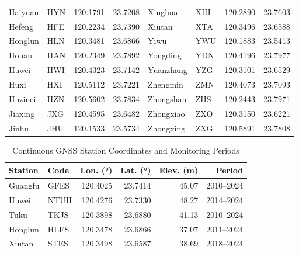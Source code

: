 \begin{table}[htbp]
\begin{tabular}{llcc|llcc}
		Haiyuan & HYN & 120.1791 & 23.7208 & Xinghua & XIH & 120.2890 & 23.7603 \\
		Hefeng & HFE & 120.2234 & 23.7390 & Xiutan & XTA & 120.3496 & 23.6588 \\
		Honglun & HLN & 120.3481 & 23.6866 & Yiwu & YWU & 120.1883 & 23.5413 \\
		Houan & HAN & 120.2349 & 23.7892 & Yongding & YDN & 120.4196 & 23.7977 \\
		Huwei & HWI & 120.4323 & 23.7142 & Yuanzhang & YZG & 120.3101 & 23.6529 \\
		Huxi & HXI & 120.5112 & 23.7221 & Zhengmin & ZMN & 120.4073 & 23.7093 \\
		Huzinei & HZN & 120.5602 & 23.7834 & Zhongshan & ZHS & 120.2443 & 23.7971 \\
		Jiaxing & JXG & 120.4595 & 23.6482 & Zhongxiao & ZXO & 120.3150 & 23.6221 \\
		Jinhu & JHU & 120.1533 & 23.5734 & Zhongxing & ZXG & 120.5891 & 23.7808 \\
		\bottomrule
	\end{tabular}
\end{table}

\begin{table}[htbp]
	\centering
	\caption{Continuous GNSS Station Coordinates and Monitoring Periods}
	\label{tab:gnss_info}
	\begin{tabular}{llrrrr}
		\toprule
		\textbf{Station} & \textbf{Code} & \textbf{Lon. (\si{\degree})} & \textbf{Lat. (\si{\degree})} & \textbf{Elev. (m)} & \textbf{Period} \\
		\midrule
		Guangfu  & GFES & 120.4025 & 23.7414 & 45.07 & 2010--2024 \\
		Huwei    & NTUH & 120.4276 & 23.7330 & 48.27 & 2014--2024 \\
		Tuku     & TKJS & 120.3898 & 23.6880 & 41.13 & 2010--2024 \\
		Honglun  & HLES & 120.3478 & 23.6866 & 37.07 & 2011--2024 \\
		Xiutan   & STES & 120.3498 & 23.6587 & 38.69 & 2018--2024 \\
		\bottomrule
	\end{tabular}
\end{table}

